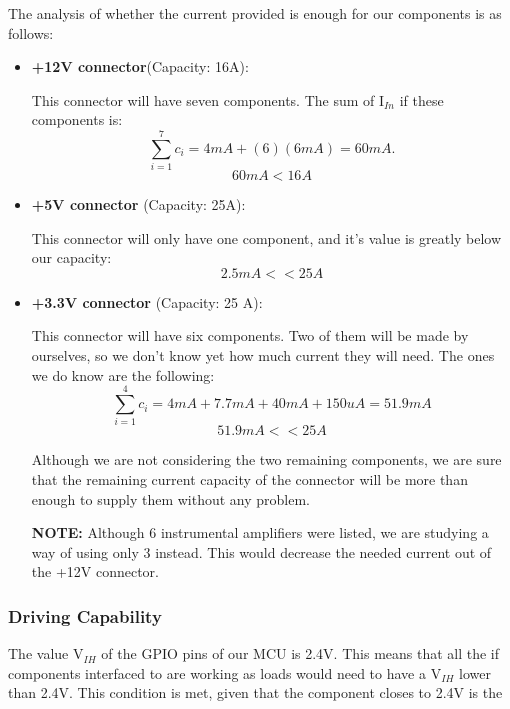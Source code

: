 			The analysis of whether the current provided is enough for our components is as follows:

			\begin{itemize}
			  \item \textbf{+12V connector}(Capacity: 16A):
			  
			  This connector will have seven components. The sum of I$_{In}$ if these components is: $$ \sum_{i=1}^{7} c_i = 4mA + (6)(6mA) = 60mA. $$ $$60 mA < 16A $$ 
			  \item \textbf{+5V connector} (Capacity: 25A):
			  
			  This connector will only have one component, and it's value is greatly below our capacity: $$2.5 mA << 25A $$ 
			  
			  \item \textbf{+3.3V connector} (Capacity: 25 A):
			  
			  This connector will have six components. Two of them will be made by ourselves, so we don't know yet how much current they will need. The ones we do know are the following: $$\sum_{i=1}^{4} c_i = 4mA + 7.7 mA + 40 mA + 150 uA = 51.9 mA $$  $$51.9mA << 25A$$
			  
			  Although we are not considering the two remaining components, we are sure that the remaining current capacity of the connector will be more than enough to supply them without any problem.
			  
			  \textbf{NOTE:} Although 6 instrumental amplifiers were listed, we are studying a way of using only 3 instead. This would decrease the needed current out of the +12V connector.
			\end{itemize} 


		\subsubsection{Driving Capability}
			The value V$_{IH}$ of the GPIO pins of our MCU is 2.4V. This means that all the if components interfaced to are working as loads would need to have a V$_{IH}$ lower than 2.4V. This condition is met, given that the component closes to 2.4V is the LCD, which has a value V$_{IH}$ of 2.25V. \\

			The value of V$_{OL}$ of the GPIO pins of our MCU is 0.4V. This means that all the components interfaced to it working as loads would need to have an V$_{OL}$ above of 0.4V. This condition as also met, as the component with the lowest value of V$_{OL}$ in the other components is 0.66V.

